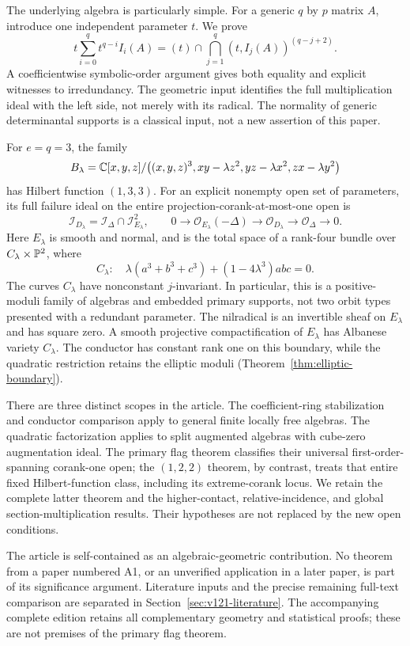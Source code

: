 The underlying algebra is particularly simple. For a generic $q$ by
$p$ matrix $A$, introduce one independent parameter $t$. We prove
\begin{equation}\label{eq:v121-intro-weighted}
 t\sum_{i=0}^q t^{q-i}I_i(A)
   =(t)\cap\bigcap_{j=1}^q(t,I_j(A))^{(q-j+2)}.
\end{equation}
A coefficientwise symbolic-order argument gives both equality and
explicit witnesses to irredundancy. The geometric input identifies
the full multiplication ideal with the left side, not merely with
its radical. The normality of generic determinantal supports is a
classical input, not a new assertion of this paper.

For $e=q=3$, the family
\[
 B_\lambda=\mathbb C[x,y,z]/\bigl((x,y,z)^3,
          xy-\lambda z^2,yz-\lambda x^2,zx-\lambda y^2\bigr)
\]
has Hilbert function $(1,3,3)$. For an explicit nonempty open set of
parameters, its full failure ideal on the entire projection-corank-at-most-one
open is
\[
 \mathcal I_{D_\lambda}=\mathcal I_\Delta\cap\mathcal I_{E_\lambda}^2,
 \qquad
 0\longrightarrow\mathcal O_{E_\lambda}(-\Delta)
 \longrightarrow\mathcal O_{D_\lambda}
 \longrightarrow\mathcal O_\Delta\longrightarrow0.
\]
Here $E_\lambda$ is smooth and normal, and is the total space of a
rank-four bundle over $C_\lambda\times\mathbb P^2$, where
\[
 C_\lambda:\quad
 \lambda(a^3+b^3+c^3)+(1-4\lambda^3)abc=0.
\]
The curves $C_\lambda$ have nonconstant $j$-invariant. In particular,
this is a positive-moduli family of algebras and embedded primary
supports, not two orbit types presented with a redundant parameter.
The nilradical is an invertible sheaf on $E_\lambda$ and has square
zero. A smooth projective compactification of $E_\lambda$ has
Albanese variety $C_\lambda$. The conductor has constant rank one
on this boundary, while the quadratic restriction retains the elliptic
moduli (Theorem~\ref{thm:elliptic-boundary}).

There are three distinct scopes in the article. The coefficient-ring
stabilization and conductor comparison apply to general finite locally
free algebras. The quadratic factorization applies to split augmented
algebras with cube-zero augmentation ideal. The primary flag theorem
classifies their universal first-order-spanning corank-one open;
the $(1,2,2)$ theorem, by contrast, treats that entire fixed
Hilbert-function class, including its extreme-corank locus. We retain
the complete latter theorem and the higher-contact, relative-incidence,
and global section-multiplication results. Their hypotheses are not
replaced by the new open conditions.

The article is self-contained as an algebraic-geometric contribution.
No theorem from a paper numbered A1, or an unverified application in a
later paper, is part of its significance argument. Literature inputs
and the precise remaining full-text comparison are separated in
Section~\ref{sec:v121-literature}. The accompanying complete edition
retains all complementary geometry and statistical proofs; these are
not premises of the primary flag theorem.
